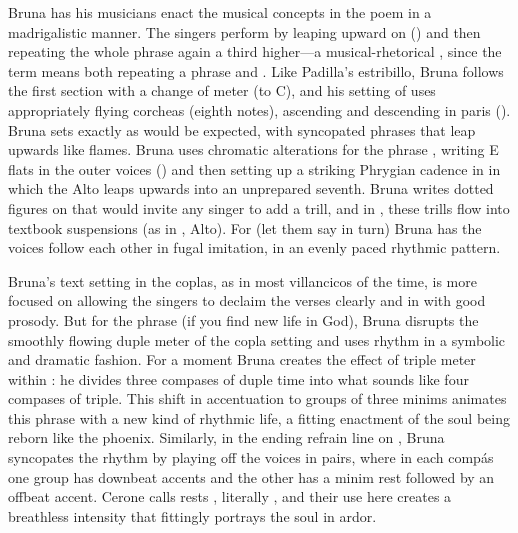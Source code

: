 Bruna has his musicians enact the musical concepts in the poem in a madrigalistic manner.
The singers perform  by leaping upward on  () and then repeating the whole phrase again a third higher---a musical-rhetorical , since the term means both repeating a phrase and .
Like Padilla's estribillo, Bruna follows the first section with a change of meter (to C), and his setting of  uses appropriately flying corcheas (eighth notes), ascending and descending in paris ().
Bruna sets  exactly as would be expected, with syncopated phrases that leap upwards like flames.
Bruna uses chromatic alterations for the phrase , writing E flats in the outer voices () and then setting up a striking Phrygian cadence in  in which the Alto leaps upwards into an unprepared seventh.
Bruna writes dotted figures on  that would invite any singer to add a trill, and in , these trills flow into textbook suspensions (as in , Alto).
For  (let them say in turn) Bruna has the voices follow each other in fugal imitation, in an evenly paced rhythmic pattern.

% 

Bruna's text setting in the coplas, as in most villancicos of the time, is more focused on allowing the singers to declaim the verses clearly and in with good prosody.
But for the phrase  (if you find new life in God), Bruna disrupts the smoothly flowing duple meter of the copla setting and uses rhythm in a symbolic and dramatic fashion.
For a moment Bruna creates the effect of triple meter within : he divides three compases of duple time into what sounds like four compases of triple.
This shift in accentuation to groups of three minims animates this phrase with a new kind of rhythmic life, a fitting enactment of the soul being reborn like the phoenix.
Similarly, in the ending refrain line on , Bruna syncopates the rhythm by playing off the voices in pairs, where in each compás one group has downbeat accents and the other has a minim rest followed by an offbeat accent.
Cerone calls rests , literally , and their use here creates a breathless intensity that fittingly portrays the soul in ardor.

